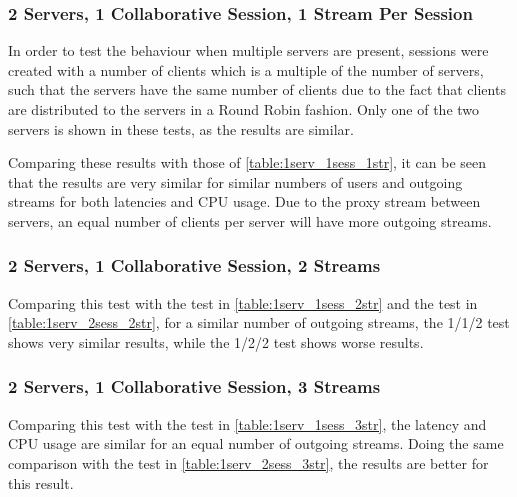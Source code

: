 \subsubsection{2 Servers, 1 Collaborative Session, 1 Stream Per Session}

In order to test the behaviour when multiple servers are present, sessions were created with a number of clients which is a multiple of the number of servers, such that the servers have the same number of clients due to the fact that clients are distributed to the servers in a Round Robin fashion. Only one of the two servers is shown in these tests, as the results are similar.

Comparing these results with those of \ref{table:1serv_1sess_1str}, it can be seen that the results are very similar for similar numbers of users and outgoing streams for both latencies and CPU usage. Due to the proxy stream between servers, an equal number of clients per server will have more outgoing streams.

\subsubsection{2 Servers, 1 Collaborative Session, 2 Streams}

Comparing this test with the test in \ref{table:1serv_1sess_2str} and the test in \ref{table:1serv_2sess_2str}, for a similar number of outgoing streams, the 1/1/2 test shows very similar results, while the 1/2/2 test shows worse results.

\subsubsection{2 Servers, 1 Collaborative Session, 3 Streams}

Comparing this test with the test in \ref{table:1serv_1sess_3str}, the latency and CPU usage are similar for an equal number of outgoing streams. Doing the same comparison with the test in \ref{table:1serv_2sess_3str}, the results are better for this result.

